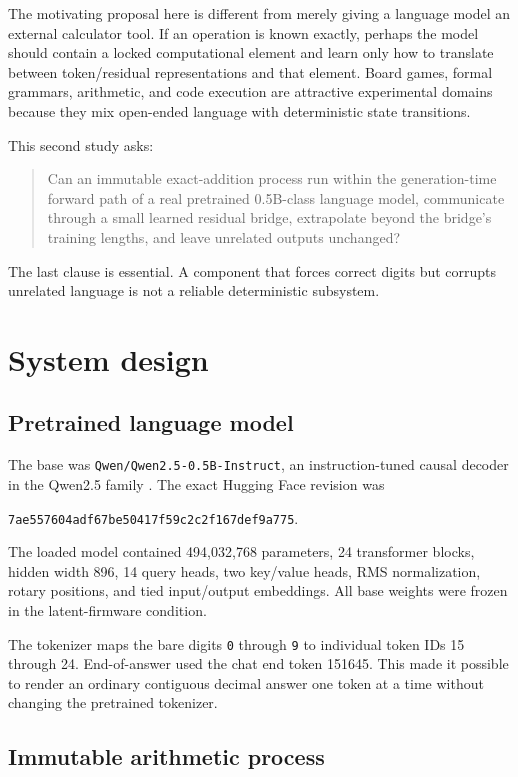 \documentclass[11pt]{article}
\newcommand{\code}[1]{\texttt{#1}}
\begin{document}
The motivating proposal here is different from merely giving a language model
an external calculator tool. If an operation is known exactly, perhaps the
model should contain a locked computational element and learn only how to
translate between token/residual representations and that element. Board games,
formal grammars, arithmetic, and code execution are attractive experimental
domains because they mix open-ended language with deterministic state
transitions.

This second study asks:

\begin{quote}
Can an immutable exact-addition process run within the generation-time forward
path of a real pretrained 0.5B-class language model, communicate through a
small learned residual bridge, extrapolate beyond the bridge's training
lengths, and leave unrelated outputs unchanged?
\end{quote}

The last clause is essential. A component that forces correct digits but
corrupts unrelated language is not a reliable deterministic subsystem.

\section{System design}

\subsection{Pretrained language model}

The base was \code{Qwen/Qwen2.5-0.5B-Instruct}, an instruction-tuned causal
decoder in the Qwen2.5 family \cite{qwen2024}. The exact Hugging Face revision
was
\begin{sloppypar}
\code{7ae557604adf67be50417f59c2c2f167def9a775}.
\end{sloppypar}
The loaded model contained 494,032,768 parameters, 24 transformer blocks,
hidden width 896, 14 query heads, two key/value heads, RMS normalization,
rotary positions, and tied input/output embeddings. All base weights were
frozen in the latent-firmware condition.

The tokenizer maps the bare digits \code{0} through \code{9} to individual
token IDs 15 through 24. End-of-answer used the chat end token 151645. This
made it possible to render an ordinary contiguous decimal answer one token at
a time without changing the pretrained tokenizer.

\subsection{Immutable arithmetic process}
\end{document}
